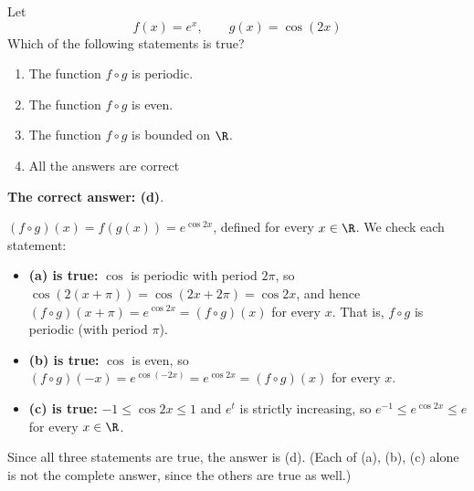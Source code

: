 
\begin{question}
Let
\[
f(x)=e^x,\qquad g(x)=\cos(2x)
\]
Which of the following statements is true?
\begin{enumerate}
  \item The function $f\circ g$ is periodic.
  \item The function $f\circ g$ is even.
  \item The function $f\circ g$ is bounded on $\R$.
  \item All the answers are correct
\end{enumerate}
\end{question}

\begin{solution}
\textbf{The correct answer: (d)}.

$(f\circ g)(x)=f(g(x))=e^{\cos 2x}$, defined for every $x\in\R$. We check each statement:
\begin{itemize}
  \item \textbf{(a) is true:} $\cos$ is periodic with period $2\pi$, so $\cos(2(x+\pi))=\cos(2x+2\pi)=\cos 2x$, and hence $(f\circ g)(x+\pi)=e^{\cos 2x}=(f\circ g)(x)$ for every $x$. That is, $f\circ g$ is periodic (with period $\pi$).
  \item \textbf{(b) is true:} $\cos$ is even, so $(f\circ g)(-x)=e^{\cos(-2x)}=e^{\cos 2x}=(f\circ g)(x)$ for every $x$.
  \item \textbf{(c) is true:} $-1\le\cos 2x\le 1$ and $e^t$ is strictly increasing, so $e^{-1}\le e^{\cos 2x}\le e$ for every $x\in\R$.
\end{itemize}
Since all three statements are true, the answer is (d). (Each of (a), (b), (c) alone is not the complete answer, since the others are true as well.)
\end{solution}
